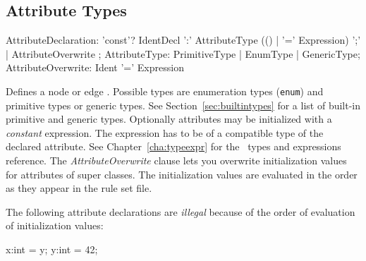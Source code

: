 \subsection{Attribute Types}
\label{sct:attrtypes}

\begin{rail}    
  AttributeDeclaration: 'const'? IdentDecl ':' AttributeType (() | '=' Expression) ';' | AttributeOverwrite ;
  AttributeType: PrimitiveType | EnumType | GenericType; 
  AttributeOverwrite: Ident '=' Expression
\end{rail}
Defines a node or edge . Possible types are enumeration types (\texttt{enum}) and primitive types or generic types.
See Section~\ref{sec:builtintypes} for a list of built-in primitive and generic types.
Optionally attributes may be initialized with a \emph{constant} expression.
The expression has to be of a compatible type of the declared attribute.
See Chapter~\ref{cha:typeexpr} for the \GrG\ types and expressions reference.
The \emph{AttributeOverwrite} clause lets you overwrite initialization values for attributes of super classes.
The initialization values are evaluated in the order as they appear in the rule set file.
\begin{note}
	The following attribute declarations are \emph{illegal} because of the order of evaluation of initialization values:
	\begin{grgen}
x:int = y;
y:int = 42;	
	\end{grgen}
\end{note}
